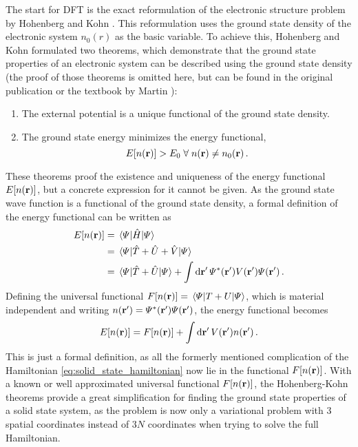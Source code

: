\documentclass[main.tex]{subfiles}
\begin{document}
The start for DFT is the exact reformulation of the electronic structure problem by Hohenberg and Kohn \cite{hohenberg_inhomogeneous_1964}.
This reformulation uses the ground state density of the electronic system \(n_0 (r)\) as the basic variable.
To achieve this, Hohenberg and Kohn \cite{hohenberg_inhomogeneous_1964} formulated two theorems, which demonstrate that the ground state properties of an electronic system can be described using the ground state density (the proof of those theorems is omitted here, but can be found in the original publication \cite{hohenberg_inhomogeneous_1964} or the textbook by Martin \cite[chapter 6.2]{martin_electronic_2004}):
\begin{enumerate}[I]
    \item The external potential is a unique functional of the ground state density.
    \item The ground state energy minimizes the energy functional,
    \[E[n(\vb{r})] > E_0 \;\forall\; n(\vb{r}) \neq n_0 (\vb{r})\,.\]
\end{enumerate}
These theorems proof the existence and uniqueness of the energy functional \(E[n(\vb{r})]\), but a concrete expression for it cannot be given.
As the ground state wave function is a functional of the ground state density, a formal definition of the energy functional can be written as
\begin{align*}
    E[n(\vb{r})] &= \expval{\hat{H}}{\Psi} \\
    &= \expval{\hat{T} + \hat{U} + \hat{V}}{\Psi} \\
    &= \expval{\hat{T} + \hat{U}}{\Psi} + \int \dd{\vb{r}^{\prime}} \Psi^* (\vb{r}^{\prime}) V(\vb{r}^{\prime}) \Psi (\vb{r}^{\prime})\,.
\end{align*}
Defining the universal functional \(F[n(\vb{r})] = \expval{T + U}{\Psi}\), which is material independent and writing \(n (\vb{r}^{\prime}) = \Psi^* (\vb{r}^{\prime}) \Psi (\vb{r}^{\prime})\), the energy functional becomes
\begin{equation}\label{eq:hohenberg_kohn_energy_functional}
    E[n(\vb{r})] = F[n(\vb{r})] + \int \dd{\vb{r}^{\prime}} V(\vb{r}^{\prime}) n (\vb{r}^{\prime})\,.
\end{equation}
This is just a formal definition, as all the formerly mentioned complication of the Hamiltonian \ref{eq:solid_state_hamiltonian} now lie in the functional \(F[n(\vb{r})]\).
With a known or well approximated universal functional \(F[n(\vb{r})]\), the Hohenberg-Kohn theorems provide a great simplification for finding the ground state properties of a solid state system, as the problem is now only a variational problem with 3 spatial coordinates instead of \(3N\) coordinates when trying to solve the full Hamiltonian.
\end{document}

